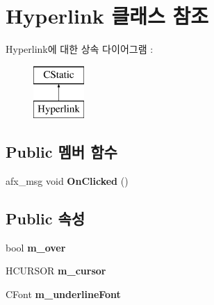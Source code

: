 \hypertarget{class_hyperlink}{}\section{Hyperlink 클래스 참조}
\label{class_hyperlink}
Hyperlink에 대한 상속 다이어그램 \+: \begin{figure}[H]
\begin{center}
\leavevmode
\includegraphics[height=2.000000cm]{class_hyperlink}
\end{center}
\end{figure}
\subsection*{Public 멤버 함수}
\begin{DoxyCompactItemize}
\item 
\mbox{\label{class_hyperlink_a9fc8208b20a3f28c07bbb66aafe6fbee}} 
afx\+\_\+msg void {\bfseries On\+Clicked} ()
\end{DoxyCompactItemize}
\subsection*{Public 속성}
\begin{DoxyCompactItemize}
\item 
\mbox{\label{class_hyperlink_a78f23c373fa8a3e7deb0cd9e0f8100f4}} 
bool {\bfseries m\+\_\+over}
\item 
\mbox{\label{class_hyperlink_a1caebeaeff16f7e5cf3a15718490b0c6}} 
H\+C\+U\+R\+S\+OR {\bfseries m\+\_\+cursor}
\item 
\mbox{\label{class_hyperlink_a613980484b9ae1fbbb22d84b60fa1f33}} 
C\+Font {\bfseries m\+\_\+underline\+Font}
\end{DoxyCompactItemize}
